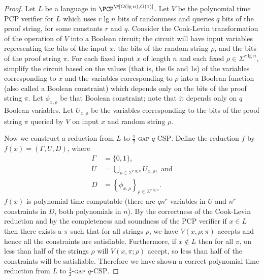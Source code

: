 \documentclass{article}
\begin{document}
\begin{proof}
  Let $L$ be a language in $\PCP^\P[O(\lg n), O(1)]$.
  Let $V$ be the polynomial time PCP verifier for $L$ which uses $r \lg n$ bits of randomness and queries $q$ bits of the proof string, for some constants $r$ and $q$.
  Consider the Cook-Levin transformation of the operation of $V$ into a Boolean circuit; the circuit will have input variables representing the bits of the input $x$, the bits of the random string $\rho$, and the bits of the proof string $\pi$.
  For each fixed input $x$ of length $n$ and each fixed $\rho \in \Sigma^{r \lg n}$, simplify the circuit based on the values (that is, the 0s and 1s) of the variables corresponding to $x$ and the variables corresponding to $\rho$ into a Boolean function (also called a Boolean constraint) which depends only on the bits of the proof string $\pi$.
  Let $\phi_{x, \rho}$ be that Boolean constraint; note that it depends only on $q$ Boolean variables.
  Let $U_{x, \rho}$ be the variables corresponding to the bits of the proof string $\pi$ queried by $V$ on input $x$ and random string $\rho$.

  Now we construct a reduction from $L$ to \textsc{$\frac{1}{2}$-gap $q$-CSP}.
  Define the reduction $f$ by $f(x) = (\Gamma, U, D)$, where
  \begin{align*}
    \Gamma & = \{0, 1\}, \\
    U & = \bigcup_{\rho \in \Sigma^{r \lg n}}{U_{x, \rho}}, \text{ and} \\
    D & = \left\{\phi_{x, \rho}\right\}_{\rho \in \Sigma^{r \lg n}}.
  \end{align*}
  $f(x)$ is polynomial time computable (there are $qn^r$ variables in $U$ and $n^r$ constraints in $D$, both polynomials in $n$).
  By the correctness of the Cook-Levin reduction and by the completeness and soundness of the PCP verifier if $x \in L$ then there exists a $\pi$ such that for all strings $\rho$, we have $V(x, \rho; \pi)$ accepts and hence all the constraints are satisfiable.
  Furthermore, if $x \notin L$ then for all $\pi$, on less than half of the strings $\rho$ will $V(x, \pi; \rho)$ accept, so less than half of the constraints will be satisfiable.
  Therefore we have shown a correct polynomial time reduction from $L$ to \textsc{$\frac{1}{2}$-gap $q$-CSP}.
\end{proof}
\end{document}
